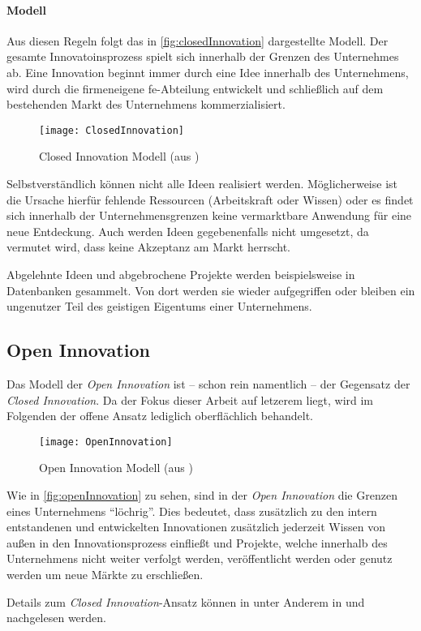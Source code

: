\paragraph{Modell}
Aus diesen Regeln folgt das in \autoref{fig:closedInnovation} dargestellte Modell.
Der gesamte Innovatoinsprozess spielt sich innerhalb der Grenzen des Unternehmes ab.
Eine Innovation beginnt immer durch eine Idee innerhalb des Unternehmens,
wird durch die firmeneigene \ac{fe}-Abteilung entwickelt
und schließlich auf dem bestehenden Markt des Unternehmens kommerzialisiert.

\begin{figure}[ht!]
    \centering
    \texttt{[image: ClosedInnovation]}
    \caption{Closed Innovation Modell (aus \cite[20]{herzog2011})}
    \label{fig:closedInnovation}
\end{figure}

Selbstverständlich können nicht alle Ideen realisiert werden.
Möglicherweise ist die Ursache hierfür fehlende Ressourcen (Arbeitskraft oder Wissen)
oder es findet sich innerhalb der Unternehmensgrenzen keine vermarktbare Anwendung für eine neue Entdeckung.
Auch werden Ideen gegebenenfalls nicht umgesetzt, da vermutet wird, dass keine Akzeptanz am Markt herrscht.

Abgelehnte Ideen und abgebrochene Projekte werden beispielsweise in Datenbanken gesammelt.
Von dort werden sie wieder aufgegriffen oder bleiben ein ungenutzer Teil des geistigen Eigentums einer Unternehmens.


\subsection{Open Innovation}\label{sec:grundlagen-open}

Das Modell der \textit{Open Innovation} ist -- schon rein namentlich -- der Gegensatz der \textit{Closed Innovation}.
Da der Fokus dieser Arbeit auf letzerem liegt,
wird im Folgenden der offene Ansatz lediglich oberflächlich behandelt.

\begin{figure}[ht!]
    \centering
    \texttt{[image: OpenInnovation]}
    \caption{Open Innovation Modell (aus \cite[23]{herzog2011})}
    \label{fig:openInnovation}
\end{figure}

Wie in \autoref{fig:openInnovation} zu sehen,
sind in der \textit{Open Innovation} die Grenzen eines Unternehmens \enquote{löchrig}.
Dies bedeutet, dass zusätzlich zu den intern entstandenen und entwickelten Innovationen
zusätzlich jederzeit Wissen von außen in den Innovationsprozess einfließt
und Projekte, welche innerhalb des Unternehmens nicht weiter verfolgt werden,
veröffentlicht werden oder genutz werden um neue Märkte zu erschließen.

Details zum \textit{Closed Innovation}-Ansatz können in unter Anderem
in \cite[60\psqq]{chesbrough2003} und \cite[21\psqq]{herzog2011} nachgelesen werden.